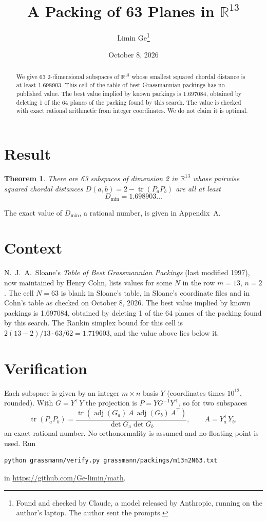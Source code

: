 \documentclass[11pt,a4paper]{article}
\title{A Packing of 63 Planes in $\mathbb{R}^{13}$}
\author{Limin Ge\thanks{Found and checked by Claude, a model released by Anthropic, running on the author's laptop. The author sent the prompts.}}
\date{October 8, 2026}
\newtheorem*{theorem}{Theorem}
\begin{document}
\maketitle
\begin{abstract}
We give 63 2-dimensional subspaces of $\mathbb{R}^{13}$ whose smallest squared chordal distance is at least 1.698903. This cell of the table of best Grassmannian packings has no published value. The best value implied by known packings is 1.697084, obtained by deleting 1 of the 64 planes of the packing found by this search. The value is checked with exact rational arithmetic from integer coordinates. We do not claim it is optimal.
\end{abstract}

\section{Result}
\begin{theorem}
There are 63 subspaces of dimension 2 in $\mathbb{R}^{13}$ whose pairwise squared chordal distances $D(a,b) = 2 - \operatorname{tr}(P_aP_b)$ are all at least
\[ D_{\min} = 1.698903\ldots \]
\end{theorem}
The exact value of $D_{\min}$, a rational number, is given in Appendix~A.


\section{Context}
N.~J.~A.~Sloane's \emph{Table of Best Grassmannian Packings} (last modified 1997), now maintained by Henry Cohn, lists values for some $N$ in the row $m=13$, $n=2$. The cell $N=63$ is blank in Sloane's table, in Sloane's coordinate files and in Cohn's table as checked on October 8, 2026. The best value implied by known packings is 1.697084, obtained by deleting 1 of the 64 planes of the packing found by this search. The Rankin simplex bound for this cell is $2(13-2)/13\cdot 63/62 = 1.719603$, and the value above lies below it.


\section{Verification}
Each subspace is given by an integer $m\times n$ basis $Y$ (coordinates times $10^{12}$, rounded). With $G=Y^\top Y$ the projection is $P=YG^{-1}Y^\top$, so for two subspaces
\[ \operatorname{tr}(P_aP_b)=\frac{\operatorname{tr}(\operatorname{adj}(G_a)\,A\,\operatorname{adj}(G_b)\,A^\top)}{\det G_a\det G_b},\qquad A=Y_a^\top Y_b, \]
an exact rational number. No orthonormality is assumed and no floating point is used. Run
\begin{verbatim}
python grassmann/verify.py grassmann/packings/m13n2N63.txt
\end{verbatim}
in \url{https://github.com/Ge-limin/math}.
\end{document}
